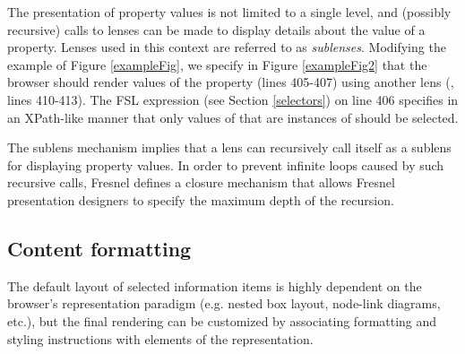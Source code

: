 The presentation of property values is not limited to a single level, and (possibly recursive) calls to lenses can be made to display details about the value of a property. Lenses used in this context are referred to as {\em sublenses}. Modifying the example of Figure \ref{exampleFig}, we specify in Figure \ref{exampleFig2} that the browser should render values of the property  (lines 405-407) using another lens (, lines 410-413). The FSL expression (see Section \ref{selectors}) on line 406 specifies in an XPath-like manner that only values of  that are instances of  should be selected.

The sublens mechanism implies that a lens can recursively call itself as a sublens for displaying property values. In order to prevent infinite loops caused by such recursive calls, Fresnel defines a closure mechanism that allows Fresnel presentation designers to specify the maximum depth of the recursion.

\subsection{Content formatting}

The default layout of selected information items is highly dependent on the browser's representation paradigm (e.g. nested box layout, node-link diagrams, etc.), but the final rendering can be customized by associating formatting and styling instructions with elements of the representation.

